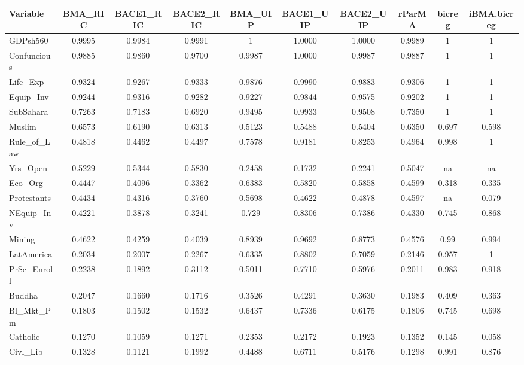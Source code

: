 \begin{landscape}
	\begin{small}\begin{longtable}{lccccccccc}\hline\hline
		Variable	&	BMA\_RIC	&	BACE1\_RIC	&	BACE2\_RIC	&	BMA\_UIP	&	BACE1\_UIP	&	BACE2\_UIP	&	rParMA	&	bicreg	&	iBMA.bicreg	\\\hline\endhead
		GDPsh560	&	0.9995	&	0.9984	&	0.9991	&	1	&	1.0000	&	1.0000	&	0.9989	&	1	&	1	\\
		Confuncious	&	0.9885	&	0.9860	&	0.9700	&	0.9987	&	1.0000	&	0.9987	&	0.9887	&	1	&	1	\\
		Life\_Exp	&	0.9324	&	0.9267	&	0.9333	&	0.9876	&	0.9990	&	0.9883	&	0.9306	&	1	&	1	\\
		Equip\_Inv	&	0.9244	&	0.9316	&	0.9282	&	0.9227	&	0.9844	&	0.9575	&	0.9202	&	1	&	1	\\
		SubSahara	&	0.7263	&	0.7183	&	0.6920	&	0.9495	&	0.9933	&	0.9508	&	0.7350	&	1	&	1	\\
		Muslim	&	0.6573	&	0.6190	&	0.6313	&	0.5123	&	0.5488	&	0.5404	&	0.6350	&	0.697	&	0.598	\\
		Rule\_of\_Law	&	0.4818	&	0.4462	&	0.4497	&	0.7578	&	0.9181	&	0.8253	&	0.4964	&	0.998	&	1	\\
		Yrs\_Open	&	0.5229	&	0.5344	&	0.5830	&	0.2458	&	0.1732	&	0.2241	&	0.5047	&	na	&	na	\\
		Eco\_Org	&	0.4447	&	0.4096	&	0.3362	&	0.6383	&	0.5820	&	0.5858	&	0.4599	&	0.318	&	0.335	\\
		Protestants	&	0.4434	&	0.4316	&	0.3760	&	0.5698	&	0.4622	&	0.4878	&	0.4597	&	na	&	0.079	\\
		NEquip\_Inv	&	0.4221	&	0.3878	&	0.3241	&	0.729	&	0.8306	&	0.7386	&	0.4330	&	0.745	&	0.868	\\
		Mining	&	0.4622	&	0.4259	&	0.4039	&	0.8939	&	0.9692	&	0.8773	&	0.4576	&	0.99	&	0.994	\\
		LatAmerica	&	0.2034	&	0.2007	&	0.2267	&	0.6335	&	0.8802	&	0.7059	&	0.2146	&	0.957	&	1	\\
		PrSc\_Enroll	&	0.2238	&	0.1892	&	0.3112	&	0.5011	&	0.7710	&	0.5976	&	0.2011	&	0.983	&	0.918	\\
		Buddha	&	0.2047	&	0.1660	&	0.1716	&	0.3526	&	0.4291	&	0.3630	&	0.1983	&	0.409	&	0.363	\\
		Bl\_Mkt\_Pm	&	0.1803	&	0.1502	&	0.1532	&	0.6437	&	0.7336	&	0.6175	&	0.1806	&	0.745	&	0.698	\\
		Catholic	&	0.1270	&	0.1059	&	0.1271	&	0.2353	&	0.2172	&	0.1923	&	0.1352	&	0.145	&	0.058	\\
		Civl\_Lib	&	0.1328	&	0.1121	&	0.1992	&	0.4488	&	0.6711	&	0.5176	&	0.1298	&	0.991	&	0.876	\\

\end{longtable}
\end{small}
\end{landscape}
